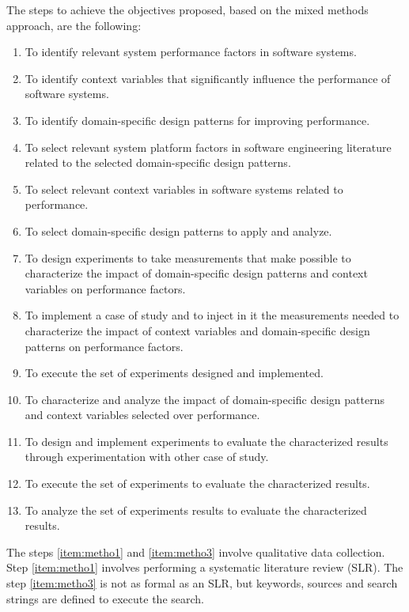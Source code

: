 The steps to achieve the objectives proposed, based on the mixed methods approach, are the following:


\begin{enumerate}
	\item To identify relevant system performance factors in software systems.
	\item To identify context variables that significantly influence the performance of software systems. \label{item:metho3}
	\item To identify domain-specific design patterns for improving performance. \label{item:metho1}
	\item To select relevant system platform factors in software engineering literature related to the selected domain-specific design patterns.
	\item To select relevant context variables in software systems related to performance.
	\item To select domain-specific design patterns to apply and analyze.
	\item To design experiments to take measurements that make possible to characterize the impact of domain-specific design patterns and context variables on performance factors.		
	\item To implement a case of study and to inject in it the measurements needed to characterize  the impact of context variables and domain-specific design patterns on performance factors.
	\item To execute the set of experiments designed and implemented. \label{item:metho9}
	\item To characterize and analyze the impact of domain-specific design patterns and context variables selected over performance.
	\item To design and implement experiments to evaluate the characterized results through experimentation with other case of study.
	\item To execute the set of experiments to evaluate the characterized results. \label{item:metho12}
	\item To analyze the set of experiments results to evaluate the characterized results.
\end{enumerate} 


The steps \ref{item:metho1} and \ref{item:metho3} involve qualitative data collection. Step \ref{item:metho1} involves performing a systematic literature review (SLR). The step \ref{item:metho3} is not as formal as an SLR, but keywords, sources and search strings are defined to execute the search. 

